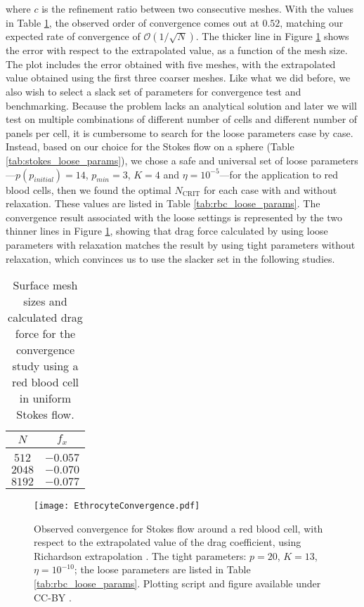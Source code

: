 \documentclass[smallcondensed,final]{svjour3}
\renewcommand{\O}[1]{\mathcal{O}(#1)}
\newcommand{\ncrit}{N_{\text{CRIT}}}
\begin{document}
\noindent where $c$ is the refinement ratio between two consecutive meshes. With the values in Table \ref{tab:rbc_richardson_values}, the observed order of convergence comes out at $0.52$, matching our expected rate of convergence of $\O{1 / \sqrt{N}}$. 
The thicker line in Figure \ref{fig:rbc_extrapolated_convergence} shows the error with respect to the extrapolated value, as a function of the mesh size. The plot includes the error obtained with five meshes, with the extrapolated value obtained using the first three coarser meshes. Like what we did before, we also wish to select a slack set of parameters for convergence test and benchmarking. Because the problem lacks an analytical solution and later we will test on multiple combinations of different number of cells and different number of panels per cell, it is cumbersome to search for the loose parameters case by case. Instead, based on our choice for the Stokes flow on a sphere (Table \ref{tab:stokes_loose_params}), we chose a safe and universal set of loose parameters---$p \left( p_{initial} \right) = 14$, $p_{min}=3$, $K=4$ and $\eta=10^{-5}$---for the application to red blood cells, then we found the optimal $\ncrit$ for each case with and without relaxation. These values are listed in Table \ref{tab:rbc_loose_params}. The convergence result associated with the loose settings is represented by the two thinner lines in Figure \ref{fig:rbc_extrapolated_convergence}, showing that drag force calculated by using loose parameters with relaxation matches the result by using tight parameters without relaxation, which convinces us to use the slacker set in the following studies. 

\begin{table}[h]
\footnotesize
\begin{center}
\begin{tabular}{c|c}
	$N$ & $f_x$ \\
	\hline
	& \\
	$512$ & $-0.057$ \\
	$2048$ & $-0.070$ \\ 
	$8192$ & $-0.077$ \\
\end{tabular}
\end{center}
\caption{Surface mesh sizes and calculated drag force for the convergence study using a red blood cell in uniform Stokes flow.}
\label{tab:rbc_richardson_values}
\end{table}%


\begin{figure}
\begin{center}
	\texttt{[image: EthrocyteConvergence.pdf]}
	\caption{Observed convergence for Stokes flow around a red blood cell, with respect to the extrapolated value of the drag coefficient, using Richardson extrapolation \cite{roache1998}. The tight parameters: $p=20$, $K=13$, $\eta=10^{-10}$; the loose parameters are listed in Table \ref{tab:rbc_loose_params}. Plotting script and figure available under CC-BY \cite{WangLaytonBarba2016-figshare4}.}
	\label{fig:rbc_extrapolated_convergence}
\end{center}
\end{figure}
\end{document}
